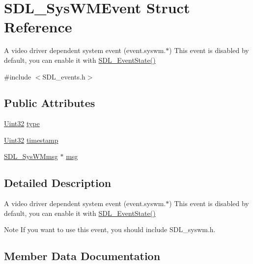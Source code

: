 \hypertarget{struct_s_d_l___sys_w_m_event}{}\section{S\+D\+L\+\_\+\+Sys\+W\+M\+Event Struct Reference}
\label{struct_s_d_l___sys_w_m_event}


A video driver dependent system event (event.\+syswm.$\ast$) This event is disabled by default, you can enable it with \hyperlink{_s_d_l__events_8h_afb772893e1c46f186fa39a4defe76df3}{S\+D\+L\+\_\+\+Event\+State()}  




{\ttfamily \#include $<$S\+D\+L\+\_\+events.\+h$>$}

\subsection*{Public Attributes}
\begin{DoxyCompactItemize}
\item 
\hyperlink{_s_d_l__stdinc_8h_add440eff171ea5f55cb00c4a9ab8672d}{Uint32} \hyperlink{struct_s_d_l___sys_w_m_event_a84697e96cb16bf6a570e10b5bfdcd392}{type}
\item 
\hyperlink{_s_d_l__stdinc_8h_add440eff171ea5f55cb00c4a9ab8672d}{Uint32} \hyperlink{struct_s_d_l___sys_w_m_event_a5d3cb97006d99b620c2671c27bd82c06}{timestamp}
\item 
\hyperlink{struct_s_d_l___sys_w_mmsg}{S\+D\+L\+\_\+\+Sys\+W\+Mmsg} $\ast$ \hyperlink{struct_s_d_l___sys_w_m_event_ad5e3dc68aa15582cd0641847d41c74e8}{msg}
\end{DoxyCompactItemize}


\subsection{Detailed Description}
A video driver dependent system event (event.\+syswm.$\ast$) This event is disabled by default, you can enable it with \hyperlink{_s_d_l__events_8h_afb772893e1c46f186fa39a4defe76df3}{S\+D\+L\+\_\+\+Event\+State()} 

\begin{DoxyNote}{Note}
If you want to use this event, you should include S\+D\+L\+\_\+syswm.\+h. 
\end{DoxyNote}


\subsection{Member Data Documentation}
\mbox{\label{struct_s_d_l___sys_w_m_event_ad5e3dc68aa15582cd0641847d41c74e8}} 
